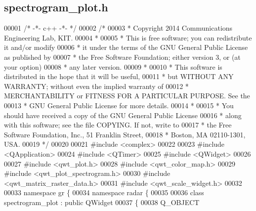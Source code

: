 \subsection{spectrogram\+\_\+plot.\+h}
\label{spectrogram__plot_8h_source}

\begin{DoxyCode}
00001 \textcolor{comment}{/* -*- c++ -*- */}
00002 \textcolor{comment}{/* }
00003 \textcolor{comment}{ * Copyright 2014 Communications Engineering Lab, KIT.}
00004 \textcolor{comment}{ * }
00005 \textcolor{comment}{ * This is free software; you can redistribute it and/or modify}
00006 \textcolor{comment}{ * it under the terms of the GNU General Public License as published by}
00007 \textcolor{comment}{ * the Free Software Foundation; either version 3, or (at your option)}
00008 \textcolor{comment}{ * any later version.}
00009 \textcolor{comment}{ * }
00010 \textcolor{comment}{ * This software is distributed in the hope that it will be useful,}
00011 \textcolor{comment}{ * but WITHOUT ANY WARRANTY; without even the implied warranty of}
00012 \textcolor{comment}{ * MERCHANTABILITY or FITNESS FOR A PARTICULAR PURPOSE.  See the}
00013 \textcolor{comment}{ * GNU General Public License for more details.}
00014 \textcolor{comment}{ * }
00015 \textcolor{comment}{ * You should have received a copy of the GNU General Public License}
00016 \textcolor{comment}{ * along with this software; see the file COPYING.  If not, write to}
00017 \textcolor{comment}{ * the Free Software Foundation, Inc., 51 Franklin Street,}
00018 \textcolor{comment}{ * Boston, MA 02110-1301, USA.}
00019 \textcolor{comment}{ */}
00020 
00021 \textcolor{preprocessor}{#include <complex>}
00022 
00023 \textcolor{preprocessor}{#include <QApplication>}
00024 \textcolor{preprocessor}{#include <QTimer>}
00025 \textcolor{preprocessor}{#include <QWidget>}
00026 
00027 \textcolor{preprocessor}{#include <qwt\_plot.h>}
00028 \textcolor{preprocessor}{#include <qwt\_color\_map.h>}
00029 \textcolor{preprocessor}{#include <qwt\_plot\_spectrogram.h>}
00030 \textcolor{preprocessor}{#include <qwt\_matrix\_raster\_data.h>}
00031 \textcolor{preprocessor}{#include <qwt\_scale\_widget.h>}
00032 
00033 \textcolor{keyword}{namespace }gr \{
00034     \textcolor{keyword}{namespace }radar \{
00035         
00036         \textcolor{keyword}{class }spectrogram_plot : \textcolor{keyword}{public} QWidget
00037         \{
00038         Q\_OBJECT

\end{DoxyCode}
